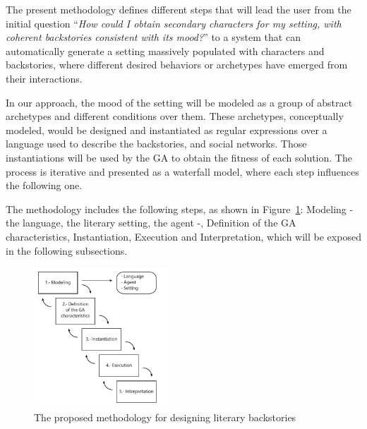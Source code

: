 \documentclass{sig-alternate}
\begin{document}
The present methodology defines different steps that will lead the user from the initial question ``\textit{How could I obtain secondary characters for my setting, with coherent backstories consistent with its mood?}'' to a system that can automatically generate a setting massively populated with characters and backstories, where different desired behaviors or archetypes have emerged from their interactions.

In our approach, the mood of the setting will be modeled as a group of abstract archetypes and different conditions over them. These archetypes, conceptually modeled, would be designed and instantiated as regular expressions over a language used to describe the backstories, and social networks. Those instantiations will be used by the GA to obtain the fitness of each solution. The process is iterative and presented as a waterfall model, where each step influences the following one.

The methodology includes the following steps, as shown in Figure~\ref{fig:methodology}: Modeling - the language, the literary setting, the agent -, Definition of the GA characteristics, Instantiation, Execution and Interpretation, which will be exposed in the following subsections.


\begin{figure}[htb]
\centering
   \includegraphics[width=12pc] {img/methodology.pdf}
\caption{The proposed methodology for designing literary backstories}
\label{fig:methodology}
\end{figure}
\end{document}
